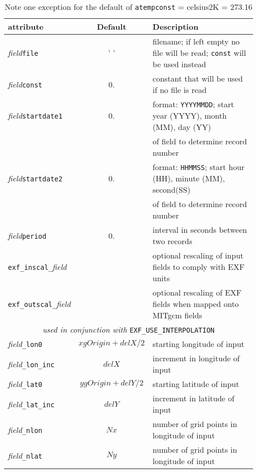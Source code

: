 \begin{table}[!ht]
  \centering
  {\footnotesize
    \begin{tabular}{|l|c|l|}
      \hline 
      \textbf{attribute} &  \textbf{Default} &  \textbf{Description}  \\
      \hline \hline
         \textit{field}\texttt{file} & ' ' & 
           filename; if left empty no file will be read; \texttt{const} will be used instead \\
         \textit{field}\texttt{const} & 0. &
           constant that will be used if no file is read  \\
         \textit{field}\texttt{startdate1} & 0. & 
           format: \texttt{YYYYMMDD}; start year (YYYY), month (MM), day (YY) \\
           ~&~& of field to determine record number \\
         \textit{field}\texttt{startdate2} & 0. &
           format: \texttt{HHMMSS}; start hour (HH), minute (MM), second(SS) \\
           ~&~& of field to determine record number\\
         \textit{field}\texttt{period} & 0. &
           interval in seconds between two records \\
         \texttt{exf\_inscal\_}\textit{field}& ~ & 
           optional rescaling of input fields to comply with EXF units \\
         \texttt{exf\_outscal\_}\textit{field}& ~ &
           optional rescaling of EXF fields when mapped onto MITgcm fields \\
         \hline
         \multicolumn{3}{|c|}{\textit{used in conjunction with} 
                              \texttt{EXF\_USE\_INTERPOLATION}} \\
         \hline
         \textit{field}\texttt{\_lon0} & $xgOrigin+delX/2$  & 
           starting longitude of input \\
         \textit{field}\texttt{\_lon\_inc} & $delX$ &
           increment in longitude of input \\
         \textit{field}\texttt{\_lat0} &  $ygOrigin+delY/2$ &
           starting latitude of input \\
         \textit{field}\texttt{\_lat\_inc} & $delY$ &
           increment in latitude of input \\
         \textit{field}\texttt{\_nlon} & $Nx$ &
           number of grid points in longitude of input \\
         \textit{field}\texttt{\_nlat} & $Ny$ &
           number of grid points in longitude of input \\
      \hline
    \end{tabular}
   }
  \caption{\newline
           Note one exception for the default of 
           \texttt{atempconst} = celsius2K = 273.16}
  \label{tab:pkg:exf:runtime_attributes}
\end{table}

